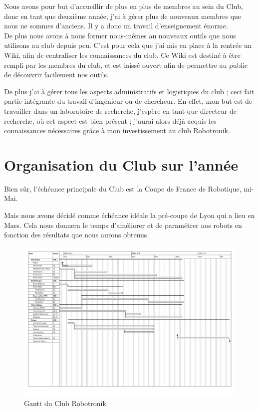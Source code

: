 \documentclass[a4paper,11pt]{article} \usepackage[T1]{fontenc} \usepackage[utf8]{inputenc} \usepackage[francais]{babel}
\begin{document}
    Nous avons pour but d'accueillir de plus en plus de membres au sein du Club, donc en tant que deuxième année, j'ai à gérer plus de nouveaux membres que nous ne sommes d'anciens. Il y a donc un travail d'enseignement énorme. \\
    De plus nous avons à nous former nous-mêmes au nouveaux outils que nous utilisons au club depuis peu. C'est pour cela que j'ai mis en place à la rentrée un Wiki, afin de centraliser les connaissances du club. Ce Wiki est destiné à être rempli par les membres du club, et est laissé ouvert afin de permettre au public de découvrir facilement nos outils.

    De plus j'ai à gérer tous les aspects administratifs et logistiques du club ; ceci fait partie intégrante du travail d'ingénieur ou de chercheur. En effet, mon but est de travailler dans un laboratoire de recherche, j'espère en tant que directeur de recherche, où cet aspect est bien présent ; j'aurai alors déjà acquis les connaissances nécessaires grâce à mon investissement au club Robotronik.

\part{Organisation du Club sur l'année}
Bien sûr, l'échéance principale du Club est la Coupe de France de Robotique, mi-Mai.

Mais nous avons décidé comme échéance idéale la pré-coupe de Lyon qui a lieu en Mars. Cela nous donnera le temps d'améliorer et de paramétrer nos robots en fonction des résultats que nous aurons obtenus.\\
\begin{figure}[h] \begin{center} \includegraphics[trim=27px 215px 17px 33px,clip=true , width=\textwidth]{Public/GanttRobo.pdf}
        \caption{Gantt du Club Robotronik} \end{center} \end{figure}
\end{document}

